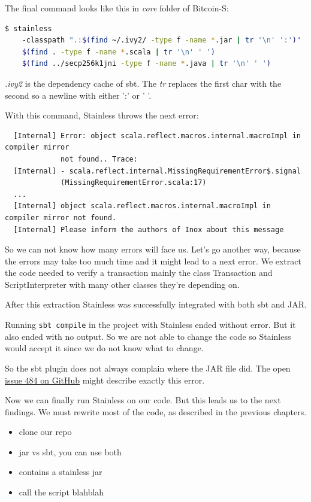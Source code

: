 \documentclass[runningheads]{llncs}
\begin{document}
The final command looks like this in \emph{core} folder of Bitcoin-S:
\begin{lstlisting}[language=bash]
  $ stainless
    -classpath ".:$(find ~/.ivy2/ -type f -name *.jar | tr '\n' ':')"
    $(find . -type f -name *.scala | tr '\n' ' ')
    $(find ../secp256k1jni -type f -name *.java | tr '\n' ' ')
\end{lstlisting}

\emph{.ivy2} is the dependency cache of sbt.  The \emph{tr} replaces
the first char with the second so a newline with either ':' or ' '.

With this command, Stainless throws the next error:
\begin{verbatim}
  [Internal] Error: object scala.reflect.macros.internal.macroImpl in compiler mirror
             not found.. Trace:
  [Internal] - scala.reflect.internal.MissingRequirementError$.signal
             (MissingRequirementError.scala:17)
  ...
  [Internal] object scala.reflect.macros.internal.macroImpl in compiler mirror not found.
  [Internal] Please inform the authors of Inox about this message
\end{verbatim}

So we can not know how many errors will face us.  Let's go another
way, because the errors may take too much time and it might lead to a
next error.  We extract the code needed to verify a transaction mainly
the class Transaction and ScriptInterpreter with many other classes
they're depending on.

After this extraction Stainless was successfully integrated with both
sbt and JAR.

Running \texttt{sbt compile} in the project with Stainless ended
without error.  But it also ended with no output.  So we are not able
to change the code so Stainless would accept it since we do not know
what to change.

So the sbt plugin does not always complain where the JAR file did.
The open
\href{https://github.com/epfl-lara/stainless/issues/484}{issue 484 on
  GitHub} might describe exactly this error.

Now we can finally run Stainless on our code.  But this leads us to
the next findings.  We must rewrite most of the code, as described in
the previous chapters.


\begin{itemize}
\item clone our repo
\item jar vs sbt, you can use both
\item contains a stainless jar
\item call the script blahblah
\end{itemize}
\end{document}
